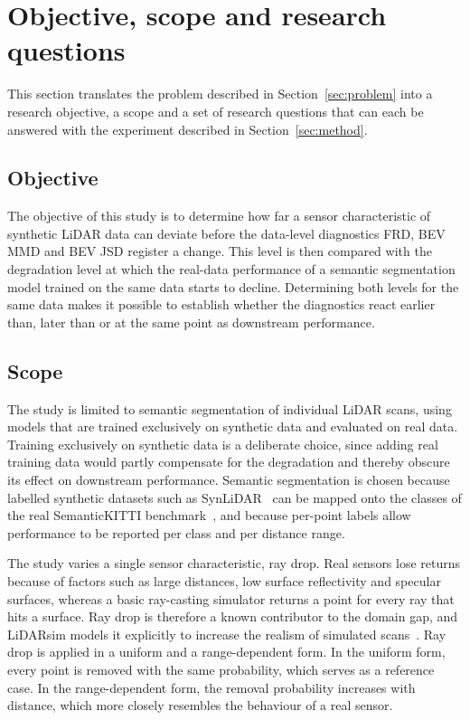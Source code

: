 \section{Objective, scope and research questions}\label{sec:questions}
This section translates the problem described in Section~\ref{sec:problem} into a research objective, a scope and a set of research questions that can each be answered with the experiment described in Section~\ref{sec:method}.

\subsection{Objective}\label{sec:objective}
The objective of this study is to determine how far a sensor characteristic of synthetic LiDAR data can deviate before the data-level diagnostics FRD, BEV MMD and BEV JSD register a change. This level is then compared with the degradation level at which the real-data performance of a semantic segmentation model trained on the same data starts to decline. Determining both levels for the same data makes it possible to establish whether the diagnostics react earlier than, later than or at the same point as downstream performance.

\subsection{Scope}\label{sec:scope}
The study is limited to semantic segmentation of individual LiDAR scans, using models that are trained exclusively on synthetic data and evaluated on real data. Training exclusively on synthetic data is a deliberate choice, since adding real training data would partly compensate for the degradation and thereby obscure its effect on downstream performance. Semantic segmentation is chosen because labelled synthetic datasets such as SynLiDAR~\cite{xiaoTransferLearningSynthetic2022} can be mapped onto the classes of the real SemanticKITTI benchmark~\cite{behleySemanticKITTIDatasetSemantic2019}, and because per-point labels allow performance to be reported per class and per distance range.

The study varies a single sensor characteristic, ray drop. Real sensors lose returns because of factors such as large distances, low surface reflectivity and specular surfaces, whereas a basic ray-casting simulator returns a point for every ray that hits a surface. Ray drop is therefore a known contributor to the domain gap, and LiDARsim models it explicitly to increase the realism of simulated scans~\cite{manivasagamLiDARsimRealisticLiDAR2020}. Ray drop is applied in a uniform and a range-dependent form. In the uniform form, every point is removed with the same probability, which serves as a reference case. In the range-dependent form, the removal probability increases with distance, which more closely resembles the behaviour of a real sensor.

